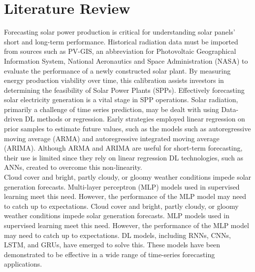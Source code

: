 \documentclass[a4paper,fleqn]{cas-sc}
\begin{document}
\section{Literature Review}
Forecasting solar power production is critical for understanding solar panels' short and long-term performance. Historical radiation data must be imported from sources such as PV-GIS, an abbreviation for Photovoltaic Geographical Information System, National Aeronautics and Space Administration (NASA) to evaluate the performance of a newly constructed solar plant. By measuring energy production viability over time, this calibration assists investors in determining the feasibility of Solar Power Plants (SPPs). Effectively forecasting solar electricity generation is a vital stage in SPP operations. Solar radiation, primarily a challenge of time series prediction, may be dealt with using Data-driven DL methods or regression. Early strategies employed linear regression on prior samples to estimate future values, such as the models such as autoregressive moving average (ARMA) and autoregressive integrated moving average (ARIMA). Although ARMA and ARIMA are useful for short-term forecasting, their use is limited since they rely on linear regression DL technologies, such as ANNs, created to overcome this non-linearity.\\
Cloud cover and bright, partly cloudy, or gloomy weather conditions impede solar generation forecasts. Multi-layer perceptron (MLP) models used in supervised learning meet this need. However, the performance of the MLP model may need to catch up to expectations. Cloud cover and bright, partly cloudy, or gloomy weather conditions impede solar generation forecasts. MLP models used in supervised learning meet this need. However, the performance of the MLP model may need to catch up to expectations. DL models, including RNNs, CNNs, LSTM, and GRUs, have emerged to solve this. These models have been demonstrated to be effective in a wide range of time-series forecasting applications.\\
\end{document}
